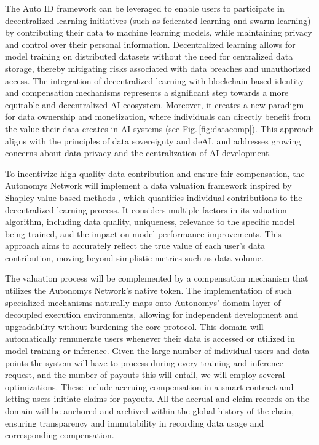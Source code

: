 \documentclass[conference]{IEEEtran}
\begin{document}
The Auto ID framework can be leveraged to enable users to participate in decentralized learning initiatives (such as federated learning and swarm learning) by contributing their data to machine learning models, while maintaining privacy and control over their personal information. Decentralized learning allows for model training on distributed datasets without the need for centralized data storage, thereby mitigating risks associated with data breaches and unauthorized access. The integration of decentralized learning with blockchain-based identity and compensation mechanisms represents a significant step towards a more equitable and decentralized AI ecosystem. Moreover, it creates a new paradigm for data ownership and monetization, where individuals can directly benefit from the value their data creates in AI systems (see Fig.\,\ref{fig:datacomp}). This approach aligns with the principles of data sovereignty and deAI, and addresses growing concerns about data privacy and the centralization of AI development\cite{lanier2013}\cite{ibarra2018}.

To incentivize high-quality data contribution and ensure fair compensation, the Autonomys Network will implement a data valuation framework inspired by Shapley-value-based methods \cite{shapley}\cite{pandl2023}, which quantifies individual contributions to the decentralized learning process. It considers multiple factors in its valuation algorithm, including data quality, uniqueness, relevance to the specific model being trained, and the impact on model performance improvements. This approach aims to accurately reflect the true value of each user's data contribution, moving beyond simplistic metrics such as data volume.

The valuation process will be complemented by a compensation mechanism that utilizes the Autonomys Network's native token. The implementation of such specialized mechanisms naturally maps onto Autonomys' domain layer of decoupled execution environments, allowing for independent development and upgradability without burdening the core protocol. This domain will automatically remunerate users whenever their data is accessed or utilized in model training or inference. Given the large number of individual users and data points the system will have to process during every training and inference request, and the number of payouts this will entail, we will employ several optimizations. These include accruing compensation in a smart contract and letting users initiate claims for payouts. All the accrual and claim records on the domain will be anchored and archived within the global history of the chain, ensuring transparency and immutability in recording data usage and corresponding compensation.
\end{document}
